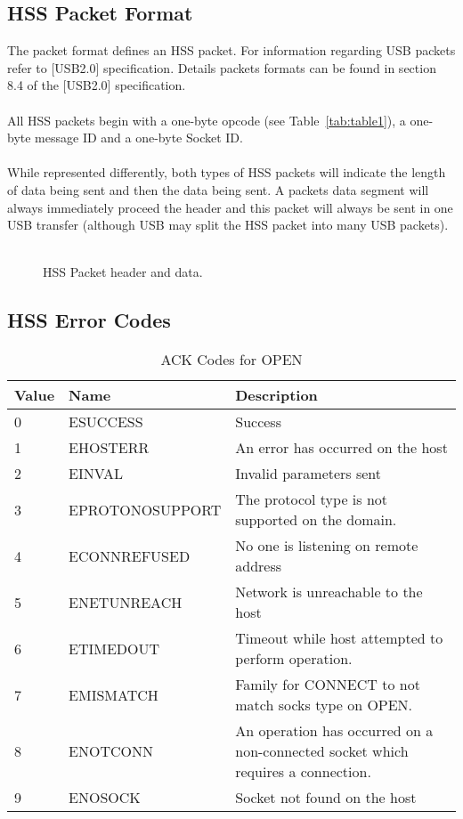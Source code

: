 \documentclass[10pt]{article}
\begin{document}
	\subsection{HSS Packet Format}
	The packet format defines an HSS packet. For information regarding USB packets refer to [USB2.0] specification. Details packets formats can be found in section 8.4 of the [USB2.0] specification. \\
	\\
	All HSS packets begin with a one-byte opcode (see Table~\ref{tab:table1}), a one-byte message ID and a one-byte Socket ID. \\
	\\
	While represented differently, both types of HSS packets will indicate the length of data being sent and then the data being sent. A packets data segment will always immediately proceed the header and this packet will always be sent in one USB transfer (although USB may split the HSS packet into many USB packets). \\
	\\
	\begin{figure}[H]
		\caption[HSS Packet header and data.]{HSS Packet header and data.}
			\centerline {
		} 
	\end{figure}
	\subsection{HSS Error Codes}
	\begin{table}[H]
		\begin{center}
			\caption{ACK Codes for OPEN}
			\label{tab:globalErrTable}
			\begin{tabular}{l|l|l} 
				\rowcolor{lightgray}
				\textbf{Value} &	\textbf{Name} & \textbf{Description}\\
				\hline
				0 & ESUCCESS & Success\\
				1 & EHOSTERR & An error has occurred on the host\\
				2 & EINVAL & Invalid parameters sent\\
				3 & EPROTONOSUPPORT & The protocol type is not supported on the domain. \\
				4 & ECONNREFUSED & No one is listening on remote address\\
				5 & ENETUNREACH & Network is unreachable to the host\\
				6 & ETIMEDOUT & Timeout while host attempted to perform operation.\\
				7 & EMISMATCH & Family for CONNECT to not match socks type on OPEN.\\
				8 & ENOTCONN & An operation has occurred on a non-connected socket which requires a connection.\\
				9 & ENOSOCK & Socket not found on the host \\
			\end{tabular}
		\end{center}
	\end{table} \mbox{}\\
\end{document}
